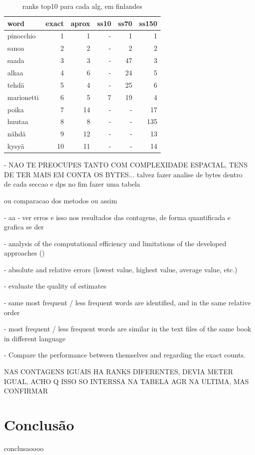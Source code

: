 \documentclass[mirror, portugues]{revdetua}
\begin{document}
\begin{table}[H]
\centering
\caption{ranks top10 para cada alg, em finlandes}
\label{table:rank10_fi}
\begin{tabular}{lrrrrr}
\toprule
word & exact & aprox & ss10 & ss70 & ss150 \\
\midrule
pinocchio & 1 & 1 & - & 1 & 1 \\
sanoa & 2 & 2 & - & 2 & 2 \\
saada & 3 & 3 & - & 47 & 3 \\
alkaa & 4 & 6 & - & 24 & 5 \\
tehdä & 5 & 4 & - & 25 & 6 \\
marionetti & 6 & 5 & 7 & 19 & 4 \\
poika & 7 & 14 & - & - & 17 \\
huutaa & 8 & 8 & - & - & 135 \\
nähdä & 9 & 12 & - & - & 13 \\
kysyä & 10 & 11 & - & - & 14 \\
\bottomrule
\end{tabular}
\end{table}


- NAO TE PREOCUPES TANTO COM COMPLEXIDADE ESPACIAL, TENS DE TER MAIS EM CONTA OS BYTES... talvez fazer analise de bytes dentro de cada seccao e dps no fim fazer uma tabela 

ou comparacao dos metodos ou assim

- aa - ver erros e isso nos resultados das contagens, de forma quantificada e grafica se der

- analysis of the computational efficiency and limitations of the developed approaches ()

    - absolute and relative errors (lowest value, highest value, average value, etc.)

    - evaluate the quality of estimates

    - same most frequent / less frequent words are identified, and in the same relative order

    - most frequent / less frequent words are similar in the text files of the same book in different language

    - Compare the performance between themselves and regarding the exact counts.

NAS CONTAGENS IGUAIS HA RANKS DIFERENTES, DEVIA METER IGUAL, ACHO Q ISSO SO INTERSSA NA TABELA AGR NA ULTIMA, MAS CONFIRMAR


\section{Conclusão}

conclusaoooo


\end{document}
